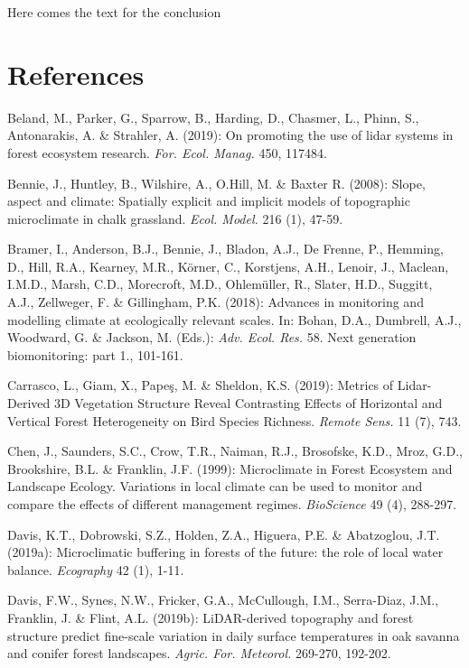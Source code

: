 \documentclass[5p]{elsarticle} %
\newlength{\cslhangindent}
\newlength{\cslentryspacingunit} %
\newenvironment{CSLReferences}[2] %
 {%
  \setlength{\parindent}{0pt}
  \ifodd #1
  \let\oldpar\par
  \def\par{\hangindent=\cslhangindent\oldpar}
  \fi
  \setlength{\parskip}{#2\cslentryspacingunit}
 }%
 {}
\begin{document}
Here comes the text for the conclusion

\hypertarget{references}{%
\section*{References}\label{references}}

\hypertarget{refs}{}
\begin{CSLReferences}{1}{0}


Beland, M., Parker, G., Sparrow, B., Harding, D., Chasmer, L., Phinn, S., Antonarakis, A. \& Strahler, A. (2019): On promoting the use of lidar systems in forest ecosystem research. \emph{For. Ecol. Manag.} 450, 117484.

Bennie, J., Huntley, B., Wilshire, A., O.Hill, M. \& Baxter R. (2008): Slope, aspect and climate: Spatially explicit and implicit models of topographic microclimate in chalk grassland. \emph{Ecol. Model.} 216 (1), 47-59.

Bramer, I., Anderson, B.J., Bennie, J., Bladon, A.J., De Frenne, P., Hemming, D., Hill, R.A., Kearney, M.R., Körner, C., Korstjens, A.H., Lenoir, J., Maclean, I.M.D., Marsh, C.D., Morecroft, M.D., Ohlemüller, R., Slater, H.D., Suggitt, A.J., Zellweger, F. \& Gillingham, P.K. (2018): Advances in monitoring and modelling climate at ecologically relevant scales. In: Bohan, D.A., Dumbrell, A.J., Woodward, G. \& Jackson, M. (Eds.): \emph{Adv. Ecol. Res.} 58. Next generation biomonitoring: part 1., 101-161.

Carrasco, L., Giam, X., Papeş, M. \& Sheldon, K.S. (2019): Metrics of Lidar-Derived 3D Vegetation Structure Reveal Contrasting Effects of Horizontal and Vertical Forest Heterogeneity on Bird Species Richness. \emph{Remote Sens.} 11 (7), 743.

Chen, J., Saunders, S.C., Crow, T.R., Naiman, R.J., Brosofske, K.D., Mroz, G.D., Brookshire, B.L. \& Franklin, J.F. (1999): Microclimate in Forest Ecosystem and Landscape Ecology. Variations in local climate can be used to monitor and compare the effects of different management regimes. \emph{BioScience} 49 (4), 288-297.

Davis, K.T., Dobrowski, S.Z., Holden, Z.A., Higuera, P.E. \& Abatzoglou, J.T. (2019a): Microclimatic buffering in forests of the future: the role of local water balance. \emph{Ecography} 42 (1), 1-11.

Davis, F.W., Synes, N.W., Fricker, G.A., McCullough, I.M., Serra-Diaz, J.M., Franklin, J. \& Flint, A.L. (2019b): LiDAR-derived topography and forest structure predict fine-scale variation in daily surface temperatures in oak savanna and conifer forest landscapes. \emph{Agric. For. Meteorol.} 269-270, 192-202.


\end{CSLReferences}
\end{document}
